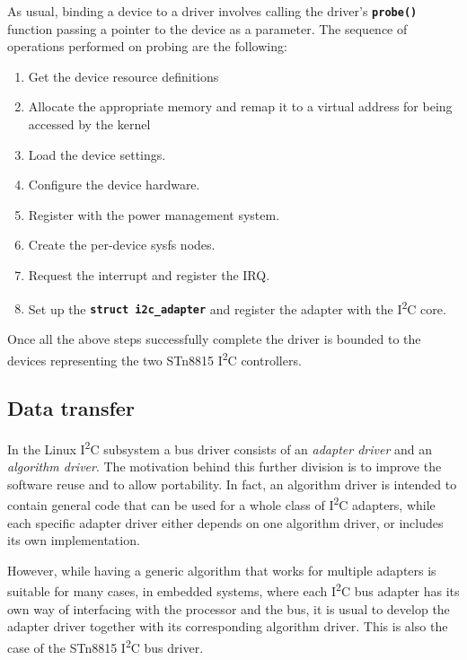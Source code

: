 \documentclass[a4paper,10pt]{article}
\newenvironment{packedenum}{
\begin{enumerate}
  \setlength{\itemsep}{3pt}
  \setlength{\parskip}{0pt}
  \setlength{\parsep}{0pt}
}{\end{enumerate}}
\newcommand{\iic}{I\textsuperscript{2}C }
\newcommand{\keyword}[1]{\texttt{\textbf{#1}}}
\begin{document}
\begin{multicols}{2}
As usual, binding a device to a driver involves calling the driver's 
\keyword{probe()} function passing a pointer to the device as a parameter.
The sequence of operations performed on probing are the following:
\begin{packedenum}
	\item Get the device resource definitions
	\item Allocate the appropriate memory and remap it to a virtual address
		for being accessed by the kernel
	\item Load the device settings.
	\item Configure the device hardware.
	\item Register with the power management system.
	\item Create the per-device sysfs nodes.
	\item Request the interrupt and	register the IRQ.
	\item Set up the \keyword{struct i2c\_adapter} and register the adapter
		with the \iic core.
\end{packedenum}

Once all the above steps successfully complete the driver is bounded to the
devices representing the two STn8815 \iic controllers.


\subsection{Data transfer}
\label{sec:adapter_data_transfer}

In the Linux \iic subsystem a bus driver consists of an \emph{adapter driver}
and an \emph{algorithm driver}. The motivation behind this further division is
to improve the software reuse and to allow portability. In fact, an algorithm
driver is intended to contain general code that can be used for a whole class
of \iic adapters, while each specific adapter driver either depends on one
algorithm driver, or includes its own implementation.

However, while having a generic algorithm that works for multiple adapters is
suitable for many cases, in embedded systems, where each \iic bus
adapter has its own way of interfacing with the processor and the bus,
it is usual to develop the adapter driver together with its corresponding
algorithm driver. This is also the case of the STn8815 \iic bus driver.


\end{multicols}
\end{document}
